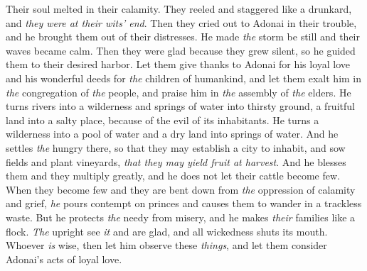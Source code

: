 \begin{biblechapter}
Their soul melted in their calamity.
\verse They reeled and staggered like a drunkard, 
and \textit{they were at their wits’ end}.
\verse Then they cried out to Adonai in their trouble, 
and he brought them out of their distresses.
\verse He made \textit{the} storm be still 
and their waves became calm.
\verse Then they were glad because they grew silent, 
so he guided them to their desired harbor.
\verse Let them give thanks to Adonai for his loyal love 
and his wonderful deeds for \textit{the} children of humankind,
\verse and let them exalt him in \textit{the} congregation of \textit{the} people, 
and praise him in \textit{the} assembly of \textit{the} elders.
\verse He turns rivers into a wilderness 
and springs of water into thirsty ground,
\verse a fruitful land into a salty place, 
because of the evil of its inhabitants.
\verse He turns a wilderness into a pool of water 
and a dry land into springs of water.
\verse And he settles \textit{the} hungry there, 
so that they may establish a city to inhabit,
\verse and sow fields and plant vineyards, 
\textit{that they may yield fruit at harvest}.
\verse And he blesses them and they multiply greatly, 
and he does not let their cattle become few.
\verse When they become few and they are bent down 
from \textit{the} oppression of calamity and grief,
\verse \textit{he} pours contempt on princes 
and causes them to wander in a trackless waste.
\verse But he protects \textit{the} needy from misery, 
and he makes \textit{their} families like a flock.
\verse \textit{The} upright see \textit{it} and are glad, 
and all wickedness shuts its mouth.
\verse Whoever \textit{is} wise, then let him observe these \textit{things}, 
and let them consider Adonai’s acts of loyal love.
\end{biblechapter}

